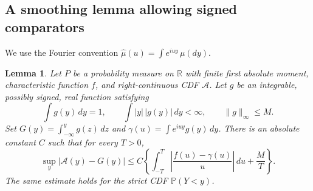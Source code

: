 \documentclass[11pt]{article}
\numberwithin{equation}{section}
\newtheorem{lemma}[theorem]{Lemma}
\theoremstyle{remark}\newtheorem{remark}[theorem]{Remark}
\newcommand{\R}{\mathbb R}
\newcommand{\Pp}{\mathbb P}
\begin{document}
\subsection{A smoothing lemma allowing signed comparators}
We use the Fourier convention $\widehat\mu(u)=\int e^{iuy}\,\mu(dy)$.
\begin{lemma}\label{srs:lem:smoothing}
Let $P$ be a probability measure on $\R$ with finite first absolute moment, characteristic function $f$, and right-continuous CDF $\mathcal A$. Let $g$ be an integrable, possibly signed, real function satisfying
\[
 \int g(y)\,dy=1,\qquad \int |y|\,|g(y)|\,dy<\infty,
 \qquad \|g\|_\infty\le M.
\]
Set $G(y)=\int_{-\infty}^y g(z)\,dz$ and $\gamma(u)=\int e^{iuy}g(y)\,dy$. There is an absolute constant $C$ such that for every $T>0$,
\begin{equation}\label{srs:eq:smoothing}
 \sup_y|\mathcal A(y)-G(y)|\le C\left\{\int_{-T}^T
 \left|\frac{f(u)-\gamma(u)}u\right|\,du+\frac MT\right\}.
\end{equation}
The same estimate holds for the strict CDF $\Pp(Y<y)$.
\end{lemma}
\end{document}
